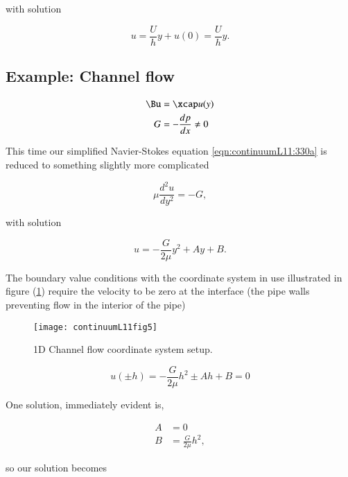 with solution

\begin{equation}\label{eqn:continuumL11:550}
u = \frac{U}{h} y + u(0) = \frac{U}{h} y.
\end{equation}

\subsection{Example: Channel flow}

\begin{align}\label{eqn:continuumL11:570}
\Bu &= \xcap u(y) \\
G &= - \frac{dp}{dx} \ne 0
\end{align}

This time our simplified Navier-Stokes equation \ref{eqn:continuumL11:330a} is reduced to something slightly more complicated

\begin{equation}\label{eqn:continuumL11:590}
\mu \frac{d^2 u}{dy^2} = -G,
\end{equation}

with solution

\begin{equation}\label{eqn:continuumL11:610}
u = -\frac{G}{2 \mu} y^2 + A y + B.
\end{equation}

The boundary value conditions with the coordinate system in use illustrated in figure (\ref{fig:continuumL11:continuumL11fig5}) require the velocity to be zero at the interface (the pipe walls preventing flow in the interior of the pipe)

\begin{figure}[htp]
   \centering
   \texttt{[image: continuumL11fig5]}
   \caption{1D Channel flow coordinate system setup.}\label{fig:continuumL11:continuumL11fig5}
\end{figure}

\begin{equation}\label{eqn:continuumL11:630}
u(\pm h) = 
-\frac{G}{2 \mu} h^2 \pm A h + B = 0
\end{equation}

One solution, immediately evident is,

\begin{align}\label{eqn:continuumL11:650}
A &= 0 \\
B &= \frac{G}{2 \mu} h^2,
\end{align}

so our solution becomes

